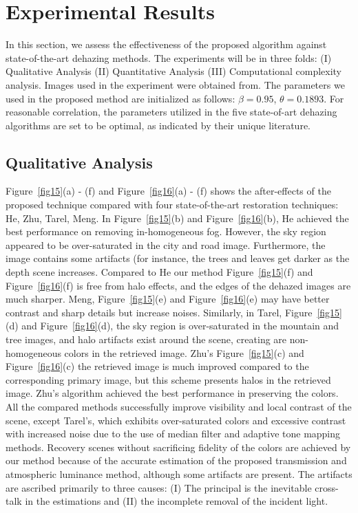 \documentclass[doctor,english,listoffigures,listoftables]{thesis-uestc}
\begin{document}
\section{Experimental Results} \label{be}
In this section, we assess the effectiveness of the proposed algorithm against state-of-the-art dehazing methods. The experiments will be in three folds: (I) Qualitative Analysis (II) Quantitative Analysis (III) Computational complexity analysis. Images used in the experiment were obtained from. The parameters we used in the proposed method are initialized as follows: $\beta = 0.95$, $\theta = 0.1893 $. For reasonable correlation, the parameters utilized in the five state-of-art  dehazing algorithms are set to be optimal, as indicated by their unique literature. 

\subsection{Qualitative Analysis}
Figure~\ref{fig15}(a) - (f) and Figure~\ref{fig16}(a) - (f) shows the after-effects of the proposed technique compared with four state-of-the-art restoration techniques: He, Zhu, Tarel, Meng. In Figure~\ref{fig15}(b) and Figure~\ref{fig16}(b), He achieved the best performance on removing in-homogeneous fog. However, the sky region appeared to be over-saturated in the city and road image. Furthermore, the image contains some artifacts (for instance, the trees and leaves get darker as the depth scene increases. Compared to He our method Figure~\ref{fig15}(f) and Figure~\ref{fig16}(f) is free from halo effects, and the edges of the dehazed images are much sharper. Meng, Figure~\ref{fig15}(e) and Figure~\ref{fig16}(e) may have better contrast and sharp details but increase noises. Similarly, in Tarel, Figure~\ref{fig15}(d) and Figure~\ref{fig16}(d), the sky region is over-saturated in the mountain and tree images, and halo artifacts exist around the scene, creating are non-homogeneous colors in the retrieved image. Zhu's Figure~\ref{fig15}(c) and Figure~\ref{fig16}(c) the retrieved image is much improved compared to the corresponding primary image, but this scheme presents halos in the retrieved image. Zhu's algorithm achieved the best performance in preserving the colors. All the compared methods successfully improve visibility and local contrast of the scene, except Tarel's, which exhibits over-saturated colors and excessive contrast with increased noise due to the use of median filter and adaptive tone mapping methods. Recovery scenes without sacrificing fidelity of the colors are achieved by our method because of the accurate estimation of the proposed transmission and atmospheric luminance method, although some artifacts are present. The artifacts are ascribed primarily to three causes: (I) The principal is the inevitable cross-talk in the estimations and (II) the incomplete removal of the incident light.
\end{document}
